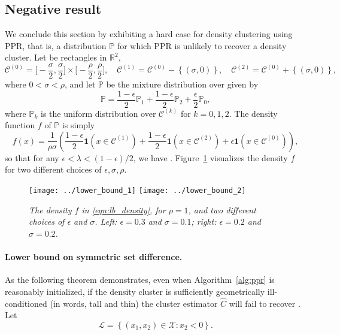 \documentclass[11pt,twoside]{article}
\newcommand{\Reals}{\mathbb{R}}
\newcommand{\set}[1]{\left\{#1\right\}}
\newcommand{\1}{\mathbf{1}}
\newcommand{\mc}[1]{\mathcal{#1}}
\newcommand{\Pbb}{\mathbb{P}}
\newcommand{\wh}[1]{\widehat{#1}}
\begin{document}
\subsection{Negative result}
\label{subsec:lower_bound}
We conclude this section by exhibiting a hard case for density clustering using PPR, that is, a distribution $\Pbb$ for which PPR is unlikely to recover a density
cluster. Let \smash{$\mc{C}^{(0)}, \mc{C}^{(1)}, \mc{C}^{(2)}$} be rectangles in
$\Reals^2$,    
$$
\mc{C}^{(0)} = \biggl[-\frac{\sigma}{2}, \frac{\sigma}{2}\biggr] \times 
\biggl[-\frac{\rho}{2}, \frac{\rho}{2}\biggr], \quad 
\mc{C}^{(1)} = \mc{C}^{(0)} - \set{(\sigma,0)}, \quad
\mc{C}^{(2)} = \mc{C}^{(0)} + \set{(\sigma,0)},
$$
where $0 < \sigma < \rho$, and let $\Pbb$ be the mixture distribution over
\smash{$\mathcal{X} = \mc{C}^{(0)} \cup \mc{C}^{(1)} \cup \mc{C}^{(2)}$} given by   
$$
\Pbb = \frac{1 - \epsilon}{2} \Pbb_1 + \frac{1 - \epsilon}{2} \Pbb_2 +
\frac{\epsilon}{2} \Pbb_0, 
$$
where $\Pbb_k$ is the uniform distribution over $\mc{C}^{(k)}$ for $k = 0,1,2$.  
The density function $f$ of $\Pbb$ is simply
\begin{equation}
\label{eqn:lb_density}
f(x) = \frac{1}{\rho\sigma}\left(\frac{1 - \epsilon}{2}\1(x \in
\mc{C}^{(1)}) + \frac{1 - \epsilon}{2}\1(x \in \mc{C}^{(2)}) +
\epsilon\1(x \in \mc{C}^{(0)})  \right), 
\end{equation}
so that for any $\epsilon < \lambda < (1 - \epsilon)/2$, we have 
\smash{$\mathbb{C}_f(\lambda) = \set{\mc{C}^{(1)}, \mc{C}^{(2)}}$}. Figure~\ref{fig:hard_case} visualizes the density $f$ for two different choices of $\epsilon,
\sigma, \rho$.  

\begin{figure}[tb]
	\centering
	\texttt{[image: ../lower\_bound\_1]}
	\texttt{[image: ../lower\_bound\_2]}
	\caption{\it\small The density $f$ in \eqref{eqn:lb_density}, for
		$\rho=1$, and two different choices of $\epsilon$ and $\sigma$. Left:
		$\epsilon = 0.3$ and $\sigma = 0.1$; right: $\epsilon = 0.2$ and 
		$\sigma = 0.2$.} 
	\label{fig:hard_case}
\end{figure}

\paragraph{Lower bound on symmetric set difference.}

As the following theorem demonstrates, even when Algorithm~\ref{alg:ppr} is
reasonably initialized, if the density cluster \smash{$\mc{C}^{(1)}$} is 
sufficiently geometrically ill-conditioned (in words, tall and thin) the cluster 
estimator $\wh{C}$ will fail to recover \smash{$\mc{C}^{(1)}$}. Let
\begin{equation}
\label{eqn:lower_set}
\mathcal{L} = \set{(x_1,x_2) \in \mathcal{X}: x_2 < 0}.
\end{equation}
\end{document}
